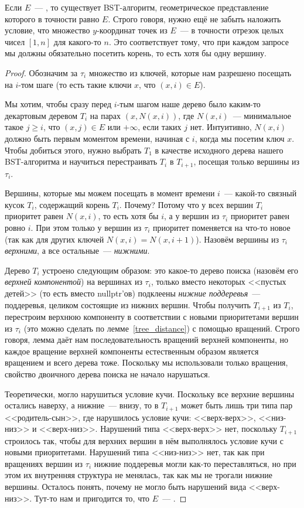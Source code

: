 \begin{theorem}\label{arbs_to_bst} Если $E$~--- \arbs, то существует BST-алгоритм, геометрическое представление
	которого в точности равно $E$. Строго говоря, нужно ещё не забыть наложить
	условие, что множество $y$-координат точек из $E$~--- в точности отрезок целых чисел $[1, n]$ для какого-то $n$. Это соответствует тому, что при каждом запросе мы должны обязательно посетить корень, то есть хотя бы одну вершину.
\end{theorem}
\begin{proof} Обозначим за $\tau_i$ множество из ключей, которые нам разрешено посещать на $i$-том шаге (то есть такие ключи $x$, что $(x, i) \in E$).

	Мы хотим, чтобы сразу перед $i$-тым шагом наше дерево было каким-то декартовым деревом $T_i$ на парах $(x, N(x, i))$, где $N(x, i)$~--- минимальное такое $j \geqslant i$, что $(x, j) \in E$ или $+\infty$, если таких $j$ нет. Интуитивно, $N(x, i)$ должно быть первым моментом времени, начиная с $i$, когда мы посетим ключ $x$. Чтобы добиться этого,
	нужно выбрать $T_1$ в качестве исходного дерева нашего BST-алгоритма и научиться перестраивать $T_i$ в $T_{i+1}$, посещая только вершины из $\tau_i$.

	Вершины, которые мы можем посещать в момент времени $i$~--- какой-то связный кусок $T_i$, содержащий корень $T_i$. Почему? Потому что у всех вершин $T_i$ приоритет равен $N(x, i)$, то есть хотя бы $i$, а у вершин из $\tau_i$ приоритет равен ровно $i$. При этом только
	у вершин из $\tau_i$ приоритет поменяется на что-то новое (так как для других ключей $N(x, i) = N(x, i + 1)$).  Назовём вершины из $\tau_i$ \emph{верхними}, а все остальные~--- \emph{нижними}.

	Дерево $T_i$ устроено следующим образом: это какое-то дерево поиска (назовём его \emph{верхней компонентой}) на вершинах из $\tau_i$, только вместо некоторых <<пустых детей>> (то есть вместо \textrm{nullptr}'ов) подклеены \emph{нижние поддеревья}~--- поддеревья, целиком состоящие из нижних вершин. Чтобы получить $T_{i + 1}$ из $T_i$, перестроим верхнюю компоненту в соответствии с новыми приоритетами вершин из $\tau_i$ (это можно сделать по лемме~\ref{tree_distance}) с помощью вращений. Строго говоря, лемма даёт нам последовательность вращений верхней компоненты, но каждое вращение верхней компоненты естественным образом является вращением и всего дерева тоже. Поскольку мы использовали только вращения, свойство двоичного дерева поиска не начало нарушаться.

	Теоретически, могло нарушиться условие кучи. Поскольку все верхние вершины остались наверху, а нижние~--- внизу, то в $T_{i + 1}$ может быть лишь три типа пар <<родитель-сын>>, где нарушилось условие кучи: <<верх-верх>>, <<низ-низ>> и <<верх-низ>>. Нарушений типа <<верх-верх>>
	нет, поскольку $T_{i + 1}$ строилось так, чтобы для верхних вершин в нём выполнялось условие кучи с новыми приоритетами. Нарушений типа <<низ-низ>> нет, так как при вращениях вершин из $\tau_i$ нижние поддеревья могли как-то переставляться, но при этом их внутренняя структура не менялась, так как мы не трогали нижние вершины. Осталось понять, почему не могло быть нарушений вида <<верх-низ>>. Тут-то нам и пригодится то, что $E$~--- \arbs.


\end{proof}
